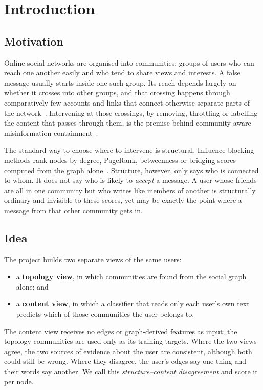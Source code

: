 \section{Introduction}
\label{sec:intro}

\subsection{Motivation}
Online social networks are organised into communities: groups of users who can reach
one another easily and who tend to share views and interests. A false message usually
starts inside one such group. Its reach depends largely on whether it crosses into
other groups, and that crossing happens through comparatively few accounts and links
that connect otherwise separate parts of the network~\citep{shah2024telegram}.
Intervening at those crossings, by removing, throttling or labelling the content that
passes through them, is the premise behind community-aware misinformation
containment~\citep{ghoshal2021community}.

The standard way to choose where to intervene is structural. Influence blocking
methods rank nodes by degree, PageRank, betweenness or bridging scores computed from
the graph alone~\citep{budak2011limiting,xie2025blocking}. Structure, however, only
says who is connected to whom. It does not say who is likely to \emph{accept} a
message. A user whose friends are all in one community but who writes like members of
another is structurally ordinary and invisible to these scores, yet may be exactly the
point where a message from that other community gets in.

\subsection{Idea}
The project builds two separate views of the same users:
\begin{itemize}
  \item a \textbf{topology view}, in which communities are found from the social graph
        alone; and
  \item a \textbf{content view}, in which a classifier that reads only each user's own
        text predicts which of those communities the user belongs to.
\end{itemize}
The content view receives no edges or graph-derived features as input; the topology
communities are used only as its training targets. Where the two views agree, the two
sources of evidence about the user are consistent, although both could still be wrong.
Where they disagree, the user's edges say one thing and their words say another. We call this
\emph{structure--content disagreement} and score it per node.

